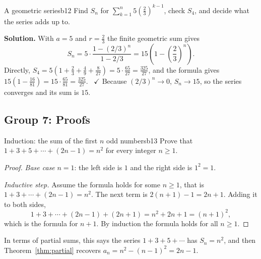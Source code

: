\documentclass[11pt]{article}
\begin{document}
\begin{exmp}{A geometric series}{b12}
Find $S_n$ for $\sum_{k=1}^n5\left(\frac23\right)^{k-1}$, check $S_4$, and decide what the series adds up to.

\textbf{Solution.} With $a=5$ and $r=\frac23$ the finite geometric sum gives
\[
S_n=5\cdot\frac{1-(2/3)^n}{1-2/3}=15\left(1-\left(\frac23\right)^n\right).
\]
Directly, $S_4=5\left(1+\frac23+\frac49+\frac8{27}\right)=5\cdot\frac{65}{27}=\frac{325}{27}$, and the formula gives $15\left(1-\frac{16}{81}\right)=15\cdot\frac{65}{81}=\frac{325}{27}$. \ $\checkmark$
Because $(2/3)^n\to0$, $S_n\to15$, so the series converges and its sum is $15$.
\end{exmp}

\subsection*{Group 7: Proofs}

\begin{exmp}{Induction: the sum of the first $n$ odd numbers}{b13}
Prove that $1+3+5+\cdots+(2n-1)=n^2$ for every integer $n\ge1$.

\begin{proof}
\emph{Base case} $n=1$: the left side is $1$ and the right side is $1^2=1$.

\emph{Inductive step.} Assume the formula holds for some $n\ge1$, that is $1+3+\cdots+(2n-1)=n^2$. The next term is $2(n+1)-1=2n+1$. Adding it to both sides,
\[
1+3+\cdots+(2n-1)+(2n+1)=n^2+2n+1=(n+1)^2 ,
\]
which is the formula for $n+1$. By induction the formula holds for all $n\ge1$.
\end{proof}
In terms of partial sums, this says the series $1+3+5+\cdots$ has $S_n=n^2$, and then Theorem~\ref{thm:partial} recovers $a_n=n^2-(n-1)^2=2n-1$.
\end{exmp}
\end{document}
